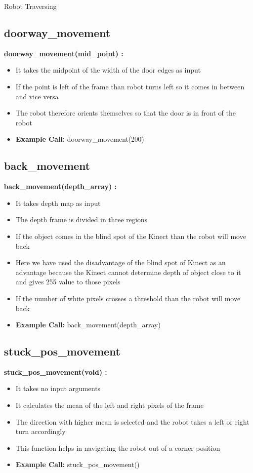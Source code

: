\documentclass[10pt, a4paper]{beamer}
\begin{document}
\begin{frame}[allowframebreaks]{Robot Traversing}
  \subsection{doorway\_movement}
    \textbf{doorway\_movement(mid\_point) : }
      \begin{itemize}
       \item It takes the midpoint of the width of the door edges as input
       \item If the point is left of the frame than robot turns left so it comes in between and vice versa
       \item The robot therefore orients themselves so that the door is in front of the robot
       \item \textbf{Example Call:} doorway\_movement(200)
      \end{itemize}
  \framebreak
  \subsection{back\_movement}
    \textbf{back\_movement(depth\_array) : }
      \begin{itemize}
       \item It takes depth map as input
       \item The depth frame is divided in three regions
       \item If the object comes in the blind spot of the Kinect than the robot will move back
       \item Here we have used the disadvantage of the blind spot of Kinect as an advantage because the Kinect cannot determine depth of object close to it and gives 255 value to those pixels
       \item If the number of white pixels crosses a threshold than the robot will move back
       \item \textbf{Example Call:} back\_movement(depth\_array)
      \end{itemize}
   \framebreak
  \subsection{stuck\_pos\_movement}
    \textbf{stuck\_pos\_movement(void) : }
      \begin{itemize}
       \item It takes no input arguments
       \item It calculates the mean of the left and right pixels of the frame
       \item The direction with higher mean is selected and the robot takes a left or right turn accordingly
       \item This function helps in navigating the robot out of a corner position
       \item \textbf{Example Call:} stuck\_pos\_movement()
      \end{itemize}
  \framebreak

\end{frame}
\end{document}
